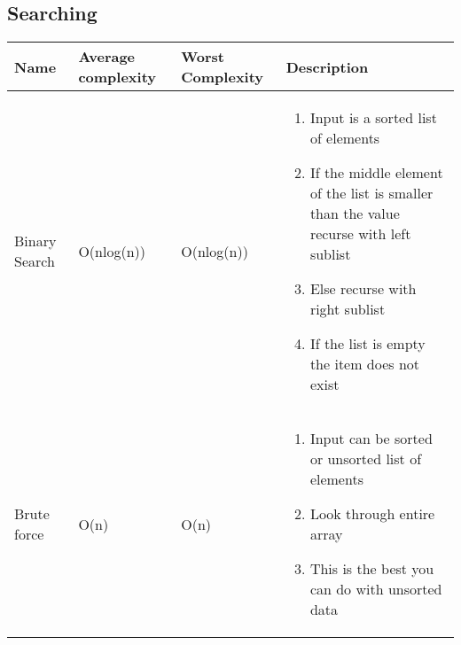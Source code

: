 \subsection{Searching}
\begin{center}
\begin{longtable}{|l|l|l|p{7cm}|}
\hline
\textbf{Name} & \textbf{Average complexity} & \textbf{Worst Complexity} & \textbf{Description} \\
\hline
Binary Search & O(nlog(n)) & O(nlog(n))
           & \begin{enumerate}
                \item Input is a sorted list of elements
                \item If the middle element of the list is smaller than the value
                      recurse with left sublist
                \item Else recurse with right sublist
                \item If the list is empty the item does not exist
              \end{enumerate}\\

\hline

Brute force & O(n) & O(n)
           & \begin{enumerate}
                \item Input can be sorted or unsorted list of elements
                \item Look through entire array
                \item This is the best you can do with unsorted data
              \end{enumerate}\\
\hline


\end{longtable}
\end{center}
